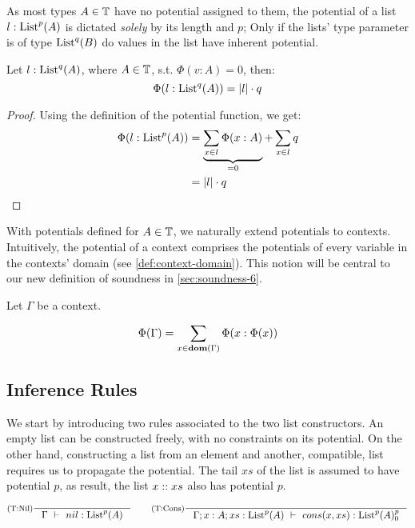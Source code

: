 As most types \(A \in \mathbb{T}\) have no potential assigned to them, the potential of a list \(l : \text{List}^{p}(A)\) is dictated \emph{solely} by its length and \(p\); Only if the lists' type parameter is of type \(\text{List}^{q}(B)\) do values in the list have inherent potential.

\begin{corollary}\label{cor:potential-list}
   Let \(l : \text{List}^{q}(A)\), where \(A \in \mathbb{T}\), s.t. \(\Phi(v : A) = 0\), then:
   \[
      \Phi(l : \text{List}^{q}(A)) = |l| \cdot q
   \]
\end{corollary}

\begin{proof}
   Using the definition of the potential function, we get:
   \begin{align*}
      \Phi(l : \text{List}^{p}(A)) &= \underbrace{\sum_{x \in l} \Phi(x : A)}_{=0} + \sum_{x \in l} q \\
                              &= |l| \cdot q
   \end{align*}
\end{proof}

With potentials defined for \(A \in \mathbb{T}\), we naturally extend potentials to contexts. Intuitively, the potential of a context comprises the potentials of every variable in the contexts' domain (see \cref{def:context-domain}). This notion will be central to our new definition of soundness in \cref{sec:soundness-6}.

\begin{definition}\label{def:context-potential}
   Let \(\Gamma\) be a context.

   \[
      \Phi(\Gamma) = \sum_{x \in \textbf{dom}(\Gamma)} \Phi(x : \Phi(x))
   \]
\end{definition}

\subsection{Inference Rules}

We start by introducing two rules associated to the two list constructors. An empty list can be constructed freely, with no constraints on its potential. On the other hand, constructing a list from an element and another, compatible, list requires us to propagate the potential. The tail \(xs\) of the list is assumed to have potential \(p\), as result, the list \(x :: xs\) also has potential \(p\). 

\[
   \inference[(T:Nil)]
   {}
   {\typing{\Gamma}{nil}{\ralist{p}{A}}}
   \qquad
   \inference[(T:Cons)]
   {}
   {\typing{\Gamma;x : A; xs : \ralist{p}{A}}{cons(x, xs)}{\ratype{\ralist{p}{A}}{p}{0}}}
\]

